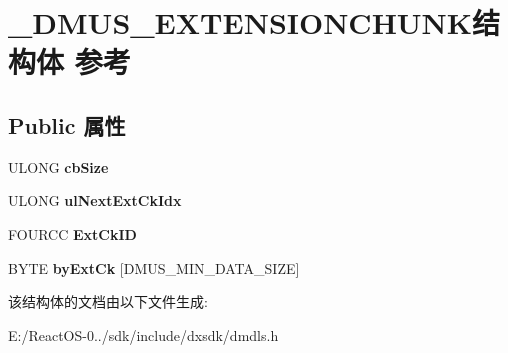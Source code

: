 \hypertarget{struct___d_m_u_s___e_x_t_e_n_s_i_o_n_c_h_u_n_k}{}\section{\+\_\+\+D\+M\+U\+S\+\_\+\+E\+X\+T\+E\+N\+S\+I\+O\+N\+C\+H\+U\+N\+K结构体 参考}
\label{struct___d_m_u_s___e_x_t_e_n_s_i_o_n_c_h_u_n_k}
\subsection*{Public 属性}
\begin{DoxyCompactItemize}
\item 
\mbox{\label{struct___d_m_u_s___e_x_t_e_n_s_i_o_n_c_h_u_n_k_aecd4e000a1e6fb71ba059c399d87d9fe}} 
U\+L\+O\+NG {\bfseries cb\+Size}
\item 
\mbox{\label{struct___d_m_u_s___e_x_t_e_n_s_i_o_n_c_h_u_n_k_a5bb935eb5196af69ba32e4fe63e57e97}} 
U\+L\+O\+NG {\bfseries ul\+Next\+Ext\+Ck\+Idx}
\item 
\mbox{\label{struct___d_m_u_s___e_x_t_e_n_s_i_o_n_c_h_u_n_k_aa87e35ef86174e996dd1d07763d07fa7}} 
F\+O\+U\+R\+CC {\bfseries Ext\+Ck\+ID}
\item 
\mbox{\label{struct___d_m_u_s___e_x_t_e_n_s_i_o_n_c_h_u_n_k_a0625feb6fedf22c5eb522d10163420bd}} 
B\+Y\+TE {\bfseries by\+Ext\+Ck} \mbox{[}D\+M\+U\+S\+\_\+\+M\+I\+N\+\_\+\+D\+A\+T\+A\+\_\+\+S\+I\+ZE\mbox{]}
\end{DoxyCompactItemize}


该结构体的文档由以下文件生成\+:\begin{DoxyCompactItemize}
\item 
E\+:/\+React\+O\+S-\/0../sdk/include/dxsdk/dmdls.\+h\end{DoxyCompactItemize}
